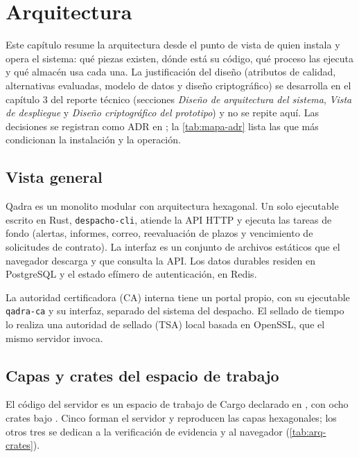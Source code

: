 \chapter{Arquitectura}\label{cap:arquitectura}

Este capítulo resume la arquitectura desde el punto de vista de quien instala
y opera el sistema: qué piezas existen, dónde está su código, qué proceso las
ejecuta y qué almacén usa cada una. La justificación del diseño (atributos de
calidad, alternativas evaluadas, modelo de datos y diseño criptográfico) se
desarrolla en el capítulo 3 del reporte técnico (secciones \emph{Diseño de
arquitectura del sistema}, \emph{Vista de despliegue} y \emph{Diseño
criptográfico del prototipo}) y no se repite aquí. Las decisiones se
registran como ADR en ; la \cref{tab:mapa-adr} lista las
que más condicionan la instalación y la operación.

\section{Vista general}\label{sec:arq-vista}

Qadra es un monolito modular con arquitectura hexagonal. Un solo ejecutable
escrito en Rust, \texttt{despacho-cli}, atiende la API HTTP y ejecuta las
tareas de fondo (alertas, informes, correo, reevaluación de plazos y
vencimiento de solicitudes de contrato). La interfaz es un conjunto de
archivos estáticos que el navegador descarga y que consulta la API. Los datos
durables residen en PostgreSQL y el estado efímero de autenticación, en Redis.

La autoridad certificadora (CA) interna tiene un portal propio, con su
ejecutable \texttt{qadra-ca} y su interfaz, separado del sistema del despacho.
El sellado de tiempo lo realiza una autoridad de sellado (TSA) local basada en
OpenSSL, que el mismo servidor invoca.


\section{Capas y crates del espacio de trabajo}\label{sec:arq-crates}

El código del servidor es un espacio de trabajo de Cargo declarado en
, con ocho crates bajo . Cinco forman el
servidor y reproducen las capas hexagonales; los otros tres se dedican a la
verificación de evidencia y al navegador (\cref{tab:arq-crates}).

